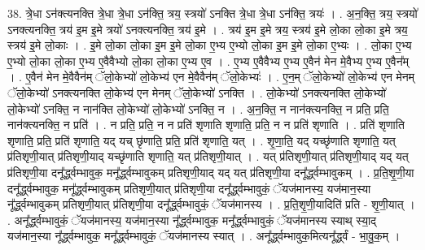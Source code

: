 \documentclass[17pt]{extarticle}
\begin{document}
38. त्रे॒धा ऽन॑क्त्यनक्ति त्रे॒धा त्रे॒धा ऽन॑क्ति॒ त्रय॒ स्त्रयो॑ ऽनक्ति त्रे॒धा त्रे॒धा ऽन॑क्ति॒ त्रयः॑ । . अ॒न॒क्ति॒ त्रय॒ स्त्रयो॑ ऽनक्त्यनक्ति॒ त्रय॑ इ॒म इ॒मे त्रयो॑ ऽनक्त्यनक्ति॒ त्रय॑ इ॒मे । . त्रय॑ इ॒म इ॒मे त्रय॒ स्त्रय॑ इ॒मे लो॒का लो॒का इ॒मे त्रय॒ स्त्रय॑ इ॒मे लो॒काः । . इ॒मे लो॒का लो॒का इ॒म इ॒मे लो॒का ए॒भ्य ए॒भ्यो लो॒का इ॒म इ॒मे लो॒का ए॒भ्यः । . लो॒का ए॒भ्य ए॒भ्यो लो॒का लो॒का ए॒भ्य ए॒वैवैभ्यो लो॒का लो॒का ए॒भ्य ए॒व । . ए॒भ्य ए॒वैवैभ्य ए॒भ्य ए॒वैन॑ मेन मे॒वैभ्य ए॒भ्य ए॒वैन᳚म् । . ए॒वैन॑ मेन मे॒वैवैन॑म् ॅलो॒केभ्यो॑ लो॒केभ्य॑ एन मे॒वैवैन॑म् ॅलो॒केभ्यः॑ । . ए॒न॒म् ॅलो॒केभ्यो॑ लो॒केभ्य॑ एन मेनम् ॅलो॒केभ्यो॑ ऽनक्त्यनक्ति लो॒केभ्य॑ एन मेनम् ॅलो॒केभ्यो॑ ऽनक्ति । . लो॒केभ्यो॑ ऽनक्त्यनक्ति लो॒केभ्यो॑ लो॒केभ्यो॑ ऽनक्ति॒ न नान॑क्ति लो॒केभ्यो॑ लो॒केभ्यो॑ ऽनक्ति॒ न । . अ॒न॒क्ति॒ न नान॑क्त्यनक्ति॒ न प्रति॒ प्रति॒ नान॑क्त्यनक्ति॒ न प्रति॑ । . न प्रति॒ प्रति॒ न न प्रति॑ शृणाति शृणाति॒ प्रति॒ न न प्रति॑ शृणाति । . प्रति॑ शृणाति शृणाति॒ प्रति॒ प्रति॑ शृणाति॒ यद् यच् छृ॑णाति॒ प्रति॒ प्रति॑ शृणाति॒ यत् । . शृ॒णा॒ति॒ यद् यच्छृ॑णाति शृणाति॒ यत् प्र॑तिशृणी॒यात् प्र॑तिशृणी॒याद् यच्छृ॑णाति शृणाति॒ यत् प्र॑तिशृणी॒यात् । . यत् प्र॑तिशृणी॒यात् प्र॑तिशृणी॒याद् यद् यत् प्र॑तिशृणी॒या दनू᳚र्द्ध्वम्भावुक॒ मनू᳚र्द्ध्वम्भावुकम् प्रतिशृणी॒याद् यद् यत् प्र॑तिशृणी॒या दनू᳚र्द्ध्वम्भावुकम् । . प्र॒ति॒शृ॒णी॒या दनू᳚र्द्ध्वम्भावुक॒ मनू᳚र्द्ध्वम्भावुकम् प्रतिशृणी॒यात् प्र॑तिशृणी॒या दनू᳚र्द्ध्वम्भावुकं॒ ॅयज॑मानस्य॒ यज॑मान॒स्या नू᳚र्द्ध्वम्भावुकम् प्रतिशृणी॒यात् प्र॑तिशृणी॒या दनू᳚र्द्ध्वम्भावुकं॒ ॅयज॑मानस्य । . प्र॒ति॒शृ॒णी॒यादिति॑ प्रति - शृ॒णी॒यात् । . अनू᳚र्द्ध्वम्भावुकं॒ ॅयज॑मानस्य॒ यज॑मान॒स्या नू᳚र्द्ध्वम्भावुक॒ मनू᳚र्द्ध्वम्भावुकं॒ ॅयज॑मानस्य स्याथ् स्या॒द् यज॑मान॒स्या नू᳚र्द्ध्वम्भावुक॒ मनू᳚र्द्ध्वम्भावुकं॒ ॅयज॑मानस्य स्यात् । . अनू᳚र्द्ध्वम्भावुक॒मित्यनू᳚र्द्ध्वं - भा॒वु॒क॒म् । \newline
\end{document}
